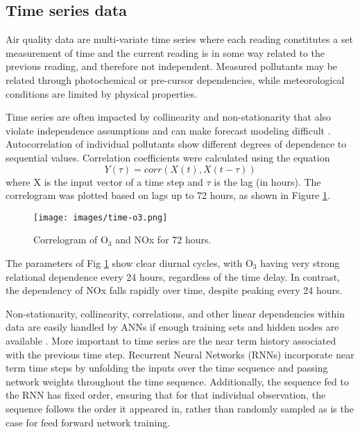 \documentclass[preprint,12pt,authoryear]{elsarticle}
\begin{document}
\begin{linenumbers}
\subsection{Time series data}
Air quality data are multi-variate time series where each reading constitutes a set measurement of time and the current reading is in some way related to the previous reading, and therefore not independent. Measured pollutants may be related through photochemical or pre-cursor dependencies, while meteorological conditions are limited by physical properties. 

Time series are often impacted by collinearity and non-stationarity that also violate independence assumptions and can make forecast modeling difficult \citep{Gheyas2011}. Autocorrelation of individual pollutants show different degrees of dependence to sequential values.  Correlation coefficients were calculated using the equation
%
\begin{equation}
\label{eq:corr}
Y(\tau)= corr(X(t),X(t - \tau))
\end{equation}
%
where X is the input vector of a time step and $\tau$ is the lag (in hours). The correlogram was plotted based on lags up to 72 hours, as shown in Figure \ref{fig:serialcorr}.
%
\begin{figure}[H]
\centering
\texttt{[image: images/time-o3.png]}  %
\caption{Correlogram of O$_{3}$ and NOx for 72 hours.}
\label{fig:serialcorr}
\end{figure}
%
The parameters of Fig \ref{fig:serialcorr} show clear diurnal cycles, with O$_{3}$ having very strong relational dependence every 24 hours, regardless of the time delay. In contrast, the dependency of NOx falls rapidly over time, despite peaking every 24 hours. 

Non-stationarity, collinearity, correlations, and other linear dependencies within data are easily handled by ANNs if enough training sets and hidden nodes are available \citep{Goodfellow2016}. More important to time series are the near term history associated with the previous time step. Recurrent Neural Networks (RNNs) incorporate near term time steps by unfolding the inputs over the time sequence and passing network weights throughout the time sequence. Additionally, the sequence fed to the RNN has fixed order, ensuring that for that individual observation, the sequence follows the order it appeared in, rather than randomly sampled as is the case for feed forward network training.


\end{linenumbers}
\end{document}
